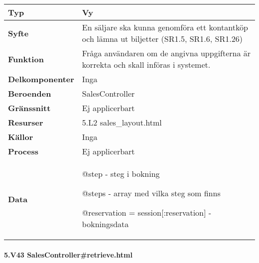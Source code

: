 \documentclass[a4paper, twoside, 11pt, titlepage]{article}
\begin{document}
			\begin {table} [ht] \begin{tabular} {  p{3.5cm} p{11.6cm} }
				\hline
				{\sffamily\textbf{Typ}} & {Vy} \\
				\hline
				{\sffamily\textbf{Syfte}} & {En säljare ska kunna genomföra ett kontantköp och lämna ut biljetter (SR1.5, SR1.6, SR1.26)} \\
				\hline
				{\sffamily\textbf{Funktion}} & {Fråga användaren om de angivna uppgifterna är korrekta och skall införas i systemet.} \\
				\hline
				{\sffamily\textbf{Delkomponenter}} & {Inga} \\
				\hline
				{\sffamily\textbf{Beroenden}} & {SalesController} \\
				\hline
				{\sffamily\textbf{Gränssnitt}} & {Ej applicerbart} \\
				\hline
				{\sffamily\textbf{Resurser}} & {5.L2 sales\_layout.html} \\
				\hline
				{\sffamily\textbf{Källor}} & {Inga} \\
				\hline
				{\sffamily\textbf{Process}} & {Ej applicerbart} \\
				\hline
				{\sffamily\textbf{Data}} & {@step - steg i bokning

@steps - array med vilka steg som finns

@reservation = session[:reservation] - bokningsdata} \\
				\hline
			\end{tabular} \end{table} \FloatBarrier


			\paragraph{5.V43 SalesController\#retrieve.html}\
\end{document}
